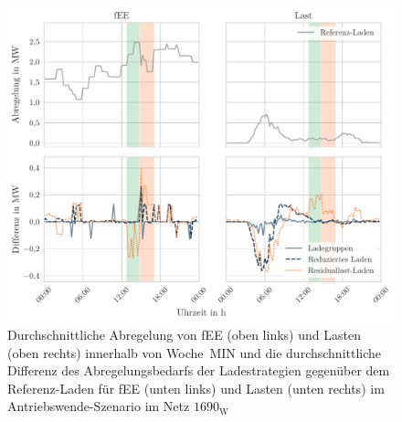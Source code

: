 \begin{figure}[H]
    \centering
    \includegraphics[width=\textwidth]{Bilder/1690_fEE_load_diff}
    \caption[Durchschnittliche Abregelung von fEE und Lasten innerhalb von Woche~MIN und die durchschnittliche Differenz des Abregelungsbedarfs der Ladestrategien gegenüber dem Referenz-Laden für fEE und Lasten im Antriebswende-Szenario im Netz \num{1690}]{Durchschnittliche Abregelung von fEE (oben links) und Lasten (oben rechts) innerhalb von Woche~MIN und die durchschnittliche Differenz des Abregelungsbedarfs der Ladestrategien gegenüber dem Referenz-Laden für fEE (unten links) und Lasten (unten rechts) im Antriebswende-Szenario im Netz \(1690_{\text{W}}\)}\label{fig:1690_fEE_load_diff}
\end{figure}
